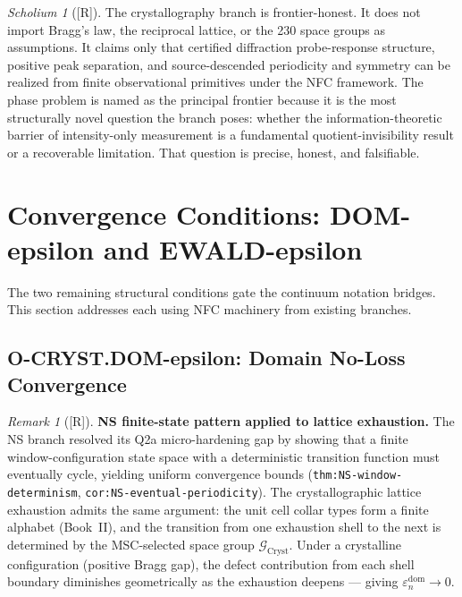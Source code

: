 \documentclass[12pt,oneside]{amsbook}
\theoremstyle{plain}
\theoremstyle{definition}
\theoremstyle{remark}
\newtheorem{remark}[theorem]{Remark}
\newtheorem{scholium}[theorem]{Scholium}
\newcommand{\status}[1]{\textup{[#1]}}
\begin{document}
\begin{scholium}[\status{R}]
The crystallography branch is frontier-honest.  It does not import
Bragg's law, the reciprocal lattice, or the 230 space groups as
assumptions.  It claims only that certified diffraction probe-response
structure, positive peak separation, and source-descended periodicity
and symmetry can be realized from finite observational primitives
under the NFC framework.  The phase problem is named as the principal
frontier because it is the most structurally novel question the branch
poses: whether the information-theoretic barrier of intensity-only
measurement is a fundamental quotient-invisibility result or a
recoverable limitation.  That question is precise, honest, and
falsifiable.
\end{scholium}

\section{Convergence Conditions: DOM-epsilon and EWALD-epsilon}
\label{sec:cryst-epsilon}

The two remaining structural conditions gate the continuum notation
bridges.  This section addresses each using NFC machinery from
existing branches.

\subsection{O-CRYST.DOM-epsilon: Domain No-Loss Convergence}

\begin{remark}[\status{R}]\label{rem:cryst-dom-eps-route}
\textbf{NS finite-state pattern applied to lattice exhaustion.}
The NS branch resolved its Q2a micro-hardening gap by showing that
a finite window-configuration state space with a deterministic
transition function must eventually cycle, yielding uniform
convergence bounds (\texttt{thm:NS-window-determinism},
\texttt{cor:NS-eventual-periodicity}).  The crystallographic lattice
exhaustion admits the same argument: the unit cell collar types form
a finite alphabet (Book~II), and the transition from one exhaustion
shell to the next is determined by the MSC-selected space group
$\mathcal{G}_{\mathrm{Cryst}}$.  Under a crystalline configuration
(positive Bragg gap), the defect contribution from each shell
boundary diminishes geometrically as the exhaustion deepens ---
giving $\varepsilon^{\mathrm{dom}}_n \to 0$.
\end{remark}
\end{document}
